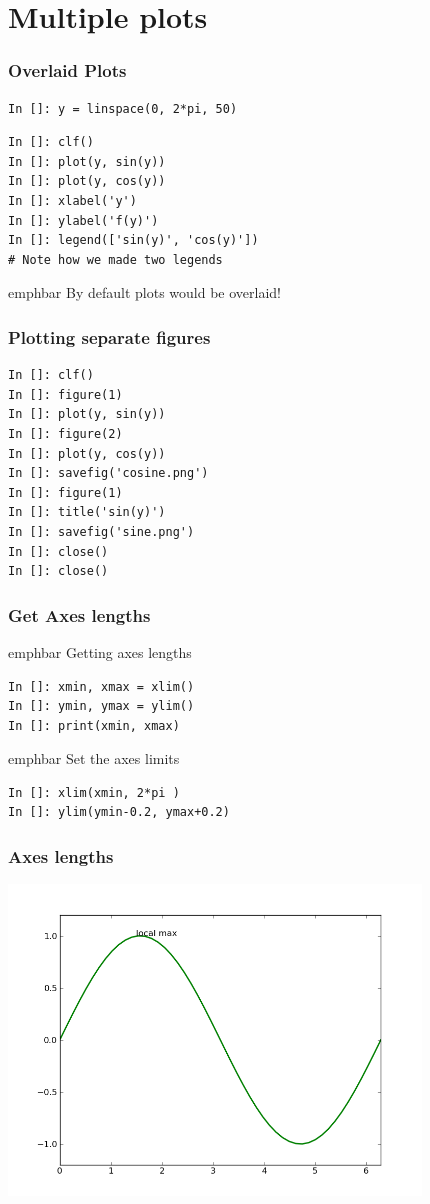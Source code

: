\documentclass[14pt,compress]{beamer}
\newcommand{\emphbar}[1]
{\begin{beamercolorbox}[rounded=true]{emphbar}
      {#1}
 \end{beamercolorbox}
}
\begin{document}
\section{Multiple plots}
\begin{frame}[fragile]
  \frametitle{Overlaid Plots}
\begin{lstlisting}
In []: y = linspace(0, 2*pi, 50)
\end{lstlisting}

\begin{lstlisting}
In []: clf()
In []: plot(y, sin(y))
In []: plot(y, cos(y))
In []: xlabel('y')
In []: ylabel('f(y)')
In []: legend(['sin(y)', 'cos(y)'])
# Note how we made two legends
\end{lstlisting}


\emphbar{By default plots would be overlaid!}
\end{frame}

\begin{frame}[fragile]
\frametitle{Plotting separate figures}
\begin{lstlisting}
In []: clf()
In []: figure(1)
In []: plot(y, sin(y))
In []: figure(2)
In []: plot(y, cos(y))
In []: savefig('cosine.png')
In []: figure(1)
In []: title('sin(y)')
In []: savefig('sine.png')
In []: close()
In []: close()
\end{lstlisting}
\end{frame}

\begin{frame}[fragile]
\frametitle{Get Axes lengths}
\emphbar{Getting axes lengths}
  \begin{lstlisting}
In []: xmin, xmax = xlim()
In []: ymin, ymax = ylim()
In []: print(xmin, xmax)
\end{lstlisting}
\pause
\emphbar{Set the axes limits}
  \begin{lstlisting}
In []: xlim(xmin, 2*pi )
In []: ylim(ymin-0.2, ymax+0.2)
  \end{lstlisting}
\end{frame}

\begin{frame}
  \frametitle{Axes lengths}
  \vspace*{-0.2in}
  \begin{center}
    \includegraphics[height=3.25in, interpolate=true]{data/limits}
  \end{center}
\end{frame}
\end{document}
